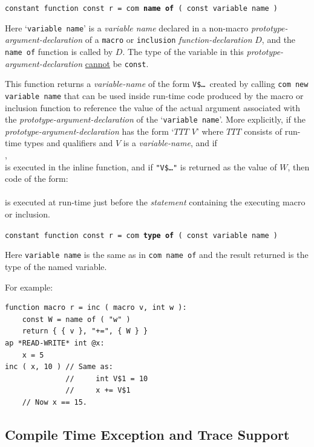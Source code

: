 \documentclass[12pt]{article}
\newcommand{\ttkey}[1]{{\tt \bfseries #1}}
\newenvironment{indpar}[1][0.3in]%
	{\begin{list}{}%
		     {\setlength{\itemsep}{0in}%
		      \setlength{\topsep}{0in}%
		      \setlength{\parsep}{1ex}%
		      \setlength{\labelwidth}{#1}%
		      \setlength{\leftmargin}{#1}%
		      \addtolength{\leftmargin}{\labelsep}}%
	 \item}%
	{\end{list}}
\begin{document}
{\tt constant function const r = com \ttkey{name of} ( const variable name )}
\begin{indpar}
Here `{\tt variable name}' is a {\em variable name}
declared in a non-macro {\em prototype-argument-declaration} of a
{\tt macro} or {\tt inclusion} {\em function-declaration} $D$,
and the {\tt name of} function is called by $D$.
The type of the variable
in this {\em proto\-type-argument-declaration} \underline{cannot}
be {\tt const}.

This function returns a {\em variable-name} of the form
{\tt V\$\ldots}~created by calling {\tt com new variable name}
that can be used inside run-time code produced by the macro or inclusion
function to reference the value of the actual argument associated with
the {\em prototype-argument-declaration} of the `{\tt variable name}'.
More explicitly,
if the {\em proto\-type-argument-declaration} has the form `$TTT$ $V$'
where $TTT$ consists of run-time types and qualifiers and $V$ is a
{\em variable-name}, and if \\
\hspace*{1in}{\tt $W$ = name of ( "$V$" )}, \\
is executed in the inline function,
and if {\tt "V\$\ldots"} is returned as the value of $W$,
then code of the form: \\
 \\
is executed at run-time just before the {\em statement} containing
the executing macro or inclusion.
\end{indpar}

{\tt constant function const r = com \ttkey{type of} ( const variable name )}
\begin{indpar}
Here {\tt variable name} is the same as in {\tt com name of} and the
result returned is the type of the named variable.
\end{indpar}

For example:
\begin{indpar}[1em]\begin{verbatim}
function macro r = inc ( macro v, int w ):
    const W = name of ( "w" )
    return { { v }, "+=", { W } }
ap *READ-WRITE* int @x:
    x = 5
inc ( x, 10 ) // Same as:
              //     int V$1 = 10
              //     x += V$1
    // Now x == 15.
\end{verbatim}\end{indpar}

\subsection{Compile Time Exception and Trace Support}
\label{COMPILE-TIME-EXCEPTION-AND-TRACE-SUPPORT}
\end{document}
